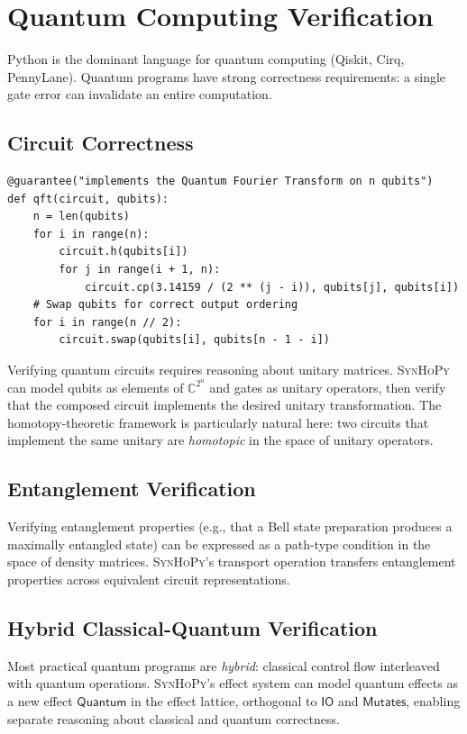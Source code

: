 \documentclass[11pt,a4paper]{report}
\theoremstyle{definition}
\theoremstyle{plain}
\newcommand{\Mutates}{\mathsf{Mutates}}
\newcommand{\IO}{\mathsf{IO}}
\newcommand{\synhopy}{\textsc{SynHoPy}}
\begin{document}
\section{Quantum Computing Verification}

Python is the dominant language for quantum computing (Qiskit, Cirq,
PennyLane).  Quantum programs have strong correctness requirements:
a single gate error can invalidate an entire computation.

\subsection{Circuit Correctness}

\begin{lstlisting}[style=synhopy]
@guarantee("implements the Quantum Fourier Transform on n qubits")
def qft(circuit, qubits):
    n = len(qubits)
    for i in range(n):
        circuit.h(qubits[i])
        for j in range(i + 1, n):
            circuit.cp(3.14159 / (2 ** (j - i)), qubits[j], qubits[i])
    # Swap qubits for correct output ordering
    for i in range(n // 2):
        circuit.swap(qubits[i], qubits[n - 1 - i])
\end{lstlisting}

Verifying quantum circuits requires reasoning about unitary matrices.
\synhopy{} can model qubits as elements of $\mathbb{C}^{2^n}$ and
gates as unitary operators, then verify that the composed circuit
implements the desired unitary transformation.  The homotopy-theoretic
framework is particularly natural here: two circuits that implement
the same unitary are \emph{homotopic} in the space of unitary operators.

\subsection{Entanglement Verification}

Verifying entanglement properties (e.g., that a Bell state preparation
produces a maximally entangled state) can be expressed as a path-type
condition in the space of density matrices.  \synhopy{}'s transport
operation transfers entanglement properties across equivalent circuit
representations.

\subsection{Hybrid Classical-Quantum Verification}

Most practical quantum programs are \emph{hybrid}: classical control
flow interleaved with quantum operations.  \synhopy{}'s effect system
can model quantum effects as a new effect $\mathsf{Quantum}$ in the
effect lattice, orthogonal to $\IO$ and $\Mutates$, enabling separate
reasoning about classical and quantum correctness.
\end{document}
